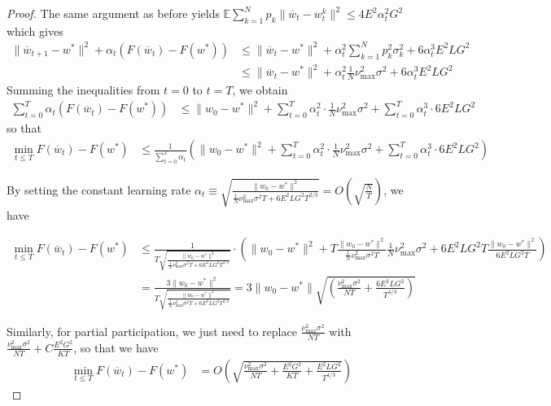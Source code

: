 \begin{proof}
	The same argument as before yields $\mathbb{E}\sum_{k=1}^{N}p_{k}\|\overline{w}_{t}-w_{t}^{k}\|^{2}\leq4E^{2}\alpha_{t}^{2}G^{2}$
	which gives 
	\begin{align*}
	\|\overline{w}_{t+1}-w^{\ast}\|^{2}+\alpha_{t}(F(\overline{w}_{t})-F(w^{\ast})) & \leq\|\overline{w}_{t}-w^{\ast}\|^{2}+\alpha_{t}^{2}\sum_{k=1}^{N}p_{k}^{2}\sigma_{k}^{2}+6\alpha_{t}^{3}E^{2}LG^{2}\\
	& \leq\|\overline{w}_{t}-w^{\ast}\|^{2}+\alpha_{t}^{2}\frac{1}{N}\nu_{\max}^{2}\sigma^{2}+6\alpha_{t}^{3}E^{2}LG^{2}
	\end{align*}
	Summing the inequalities from $t=0$ to $t=T$, we obtain 
	\begin{align*}
	\sum_{t=0}^{T}\alpha_{t}(F(\overline{w}_{t})-F(w^{\ast})) & \leq\|w_{0}-w^{\ast}\|^{2}+\sum_{t=0}^{T}\alpha_{t}^{2}\cdot\frac{1}{N}\nu_{\max}^{2}\sigma^{2}+\sum_{t=0}^{T}\alpha_{t}^{3}\cdot6E^{2}LG^{2}
	\end{align*}
	so that
	\begin{align*}
	\min_{t\leq T}F(\overline{w}_{t})-F(w^{\ast}) & \leq\frac{1}{\sum_{t=0}^{T}\alpha_{t}}\left(\|w_{0}-w^{\ast}\|^{2}+\sum_{t=0}^{T}\alpha_{t}^{2}\cdot\frac{1}{N}\nu_{\max}^{2}\sigma^{2}+\sum_{t=0}^{T}\alpha_{t}^{3}\cdot6E^{2}LG^{2}\right)
	\end{align*}
	
	By setting the constant learning rate $\alpha_{t}\equiv\sqrt{\frac{\|w_{0}-w^{\ast}\|^{2}}{\frac{1}{N}\nu_{\max}^{2}\sigma^{2}T+6E^{2}LG^{2}T^{2/3}}}=O(\sqrt{\frac{N}{T}})$,
	we have 
	
	\begin{align*}
	\min_{t\leq T}F(\overline{w}_{t})-F(w^{\ast}) & \leq\frac{1}{T\sqrt{\frac{\|w_{0}-w^{\ast}\|^{2}}{\frac{1}{N}\nu_{\max}^{2}\sigma^{2}T+6E^{2}LG^{2}T^{2/3}}}}\cdot\left(\|w_{0}-w^{\ast}\|^{2}+T\frac{\|w_{0}-w^{\ast}\|^{2}}{\frac{1}{N}\nu_{\max}^{2}\sigma^{2}T}\frac{1}{N}\nu_{\max}^{2}\sigma^{2}+6E^{2}LG^{2}T\frac{\|w_{0}-w^{\ast}\|^{2}}{6E^{2}LG^{2}T}\right)\\
	& =\frac{3\|w_{0}-w^{\ast}\|^{2}}{T\sqrt{\frac{\|w_{0}-w^{\ast}\|^{2}}{\frac{1}{N}\nu_{\max}^{2}\sigma^{2}T+6E^{2}LG^{2}T^{2/3}}}}=3\|w_{0}-w^{\ast}\|\sqrt{(\frac{\nu_{\max}^{2}\sigma^{2}}{NT}+\frac{6E^{2}LG^{2}}{T^{4/3}})}
	\end{align*}
	
	Similarly, for partial participation, we just need to replace $\frac{\nu_{\max}^{2}\sigma^{2}}{NT}$
	with $\frac{\nu_{\max}^{2}\sigma^{2}}{NT}+C\frac{E^{2}G^{2}}{KT}$,
	so that we have 
	\begin{align*}
	\min_{t\leq T}F(\overline{w}_{t})-F(w^{\ast}) & =O(\sqrt{\frac{\nu_{\max}^{2}\sigma^{2}}{NT}+\frac{E^{2}G^{2}}{KT}+\frac{E^{2}LG^{2}}{T^{4/3}}})
	\end{align*}
\end{proof}